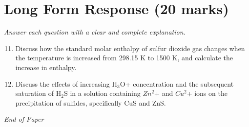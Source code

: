 \documentclass[12pt]{article}
\begin{document}
\section*{Long Form Response (20 marks)}
\textit{Answer each question with a clear and complete explanation.}
\begin{enumerate}[label=\arabic*.]
\setcounter{enumi}{10}
\item Discuss how the standard molar enthalpy of sulfur dioxide gas changes when the temperature is increased from 298.15 K to 1500 K, and calculate the increase in enthalpy.
\item Discuss the effects of increasing H$_{3}$O+ concentration and the subsequent saturation of H$_{2}$S in a solution containing $Zn^2$+ and $Cu^2$+ ions on the precipitation of sulfides, specifically CuS and ZnS.
\end{enumerate}

\vfill
\noindent\textit{End of Paper}
\end{document}
